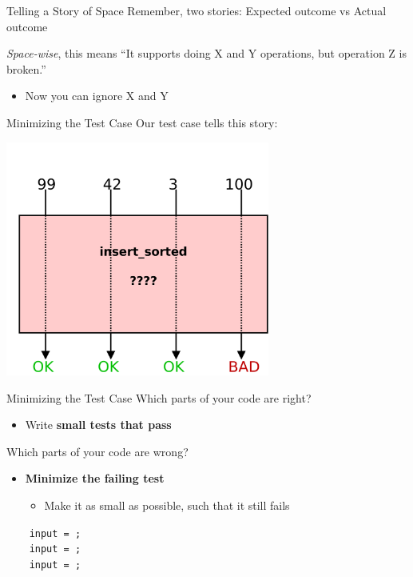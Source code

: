 \documentclass[xcolor=dvipsnames]{beamer}
\begin{document}
\begin{frame}{Telling a Story of Space}
	Remember, two stories: Expected outcome vs Actual outcome

	\linegap
	{\em Space-wise}, this means ``It supports doing X and Y operations, but operation Z is broken.''
	\begin{itemize}
		\item Now you can ignore X and Y
	\end{itemize}
\end{frame}

\begin{frame}{Minimizing the Test Case}
	Our test case tells this story:

	\begin{center}
	\includegraphics[width=0.65\textwidth]{space0.png}
	\end{center}
\end{frame}

\begin{frame}{Minimizing the Test Case}
	Which parts of your code are right?
	\begin{itemize}
		\item Write {\bf small tests that pass}
	\end{itemize}
	\linegap

	Which parts of your code are wrong?
	\begin{itemize}
		\item {\bf Minimize the failing test}
		\begin{itemize}
			\item Make it as small as possible, such that it still fails
		\end{itemize}
	\end{itemize}
	\pause
	\linegap

	\texttt{~~~~input~=~;~~~~~} \\
	\texttt{~~~~input~=~;~} \\
	\pause
	\texttt{~~~~input~=~;~} \\
\end{frame}
\end{document}
